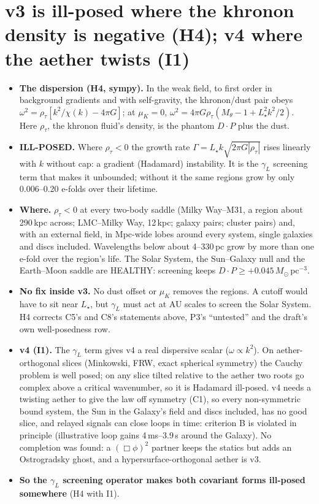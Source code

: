 \documentclass[10pt]{article}
\begin{document}
\section{v3 is ill-posed where the khronon density is negative (H4); v4 where the aether twists (I1)}\label{sec:illposed}
\begin{itemize}
\item \textbf{The dispersion (H4, sympy).} In the weak field, to first order in background gradients and with self-gravity, the khronon/dust pair obeys $\omega^2=\rho_\tau[k^2/\chi(k)-4\pi G]$; at $\mu_K=0$, $\omega^2=4\pi G\rho_\tau(M_\theta-1+L_\star^2k^2/2)$. Here $\rho_\tau$, the khronon fluid's density, is the phantom $D\cdot P$ plus the dust.
\item \textbf{ILL-POSED.} Where $\rho_\tau<0$ the growth rate $\Gamma=L_\star k\sqrt{2\pi G|\rho_\tau|}$ rises linearly with $k$ without cap: a gradient (Hadamard) instability. It is the $\gamma_L$ screening term that makes it unbounded; without it the same regions grow by only 0.006--0.20 e-folds over their lifetime.
\item \textbf{Where.} $\rho_\tau<0$ at every two-body saddle (Milky Way--M31, a region about 290\,kpc across; LMC--Milky Way, 12\,kpc; galaxy pairs; cluster pairs) and, with an external field, in Mpc-wide lobes around every system, single galaxies and discs included. Wavelengths below about 4--330\,pc grow by more than one e-fold over the region's life. The Solar System, the Sun--Galaxy null and the Earth--Moon saddle are HEALTHY: screening keeps $D\cdot P\ge+0.045\,M_\odot$\,pc$^{-3}$.
\item \textbf{No fix inside v3.} No dust offset or $\mu_K$ removes the regions. A cutoff would have to sit near $L_\star$, but $\gamma_L$ must act at AU scales to screen the Solar System. H4 corrects C5's and C8's statements above, P3's ``untested'' and the draft's own well-posedness row.
\item \textbf{v4 (I1).} The $\gamma_L$ term gives v4 a real dispersive scalar ($\omega\propto k^2$). On aether-orthogonal slices (Minkowski, FRW, exact spherical symmetry) the Cauchy problem is well posed; on any slice tilted relative to the aether two roots go complex above a critical wavenumber, so it is Hadamard ill-posed. v4 needs a twisting aether to give the law off symmetry (C1), so every non-symmetric bound system, the Sun in the Galaxy's field and discs included, has no good slice, and relayed signals can close loops in time: criterion B is violated in principle (illustrative loop gains 4\,ms--3.9\,s around the Galaxy). No completion was found: a $(\Box\phi)^2$ partner keeps the statics but adds an Ostrogradsky ghost, and a hypersurface-orthogonal aether is v3.
\item \textbf{So the $\gamma_L$ screening operator makes both covariant forms ill-posed somewhere} (H4 with I1).
\end{itemize}
\end{document}
